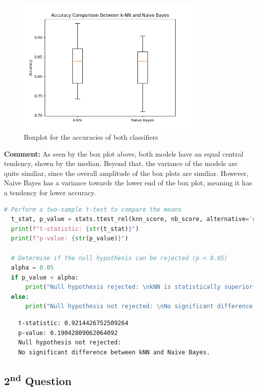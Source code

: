 \documentclass{article}
\begin{document}
  \begin{figure}[H]
    \centering
    \includegraphics[width=0.8\textwidth]{images/boxplot.png}
    \caption{Boxplot for the accuracies of both classifiers}
    \label{fig:boxplot}
  \end{figure}

  \textbf{Comment:}
  As seen by the box plot above, both models have an equal central tendency, shown by the median. Beyond that, the variance of the models are quite similiar, since the overall amplitude of the box plots are similiar. However, Naive Bayes has a variance towards the lower end of the box plot, meaning it has a tendency for lower accuracy.

  \begin{lstlisting}[language=Python]
    # Perform a two-sample t-test to compare the means
  t_stat, p_value = stats.ttest_rel(knn_score, nb_score, alternative='greater')
  print(f"t-statistic: {str(t_stat)}")
  print(f"p-value: {str(p_value)}")

  # Determine if the null hypothesis can be rejected (p < 0.05)
  alpha = 0.05
  if p_value < alpha:
      print("Null hypothesis rejected: \nkNN is statistically superior to Naive Bayes.")
  else:
      print("Null hypothesis not rejected: \nNo significant difference between kNN and Naive Bayes.")
  \end{lstlisting}

  \begin{lstlisting}
    t-statistic: 0.9214426752509264
    p-value: 0.19042809062064092
    Null hypothesis not rejected: 
    No significant difference between kNN and Naive Bayes.
  \end{lstlisting}




\subsection*{2\textsuperscript{nd} Question}
\end{document}
